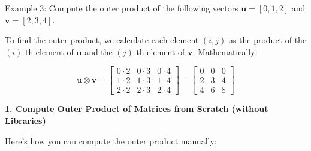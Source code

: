 \documentclass[
  letterpaper,
  DIV=11,
  numbers=noendperiod]{scrreprt}
\theoremstyle{plain}
\theoremstyle{definition}
\theoremstyle{remark}
\begin{document}
Example 3: Compute the outer product of the following vectors
\(\mathbf{u} = [0, 1, 2]\) and \(\mathbf{v} = [2, 3, 4]\).

To find the outer product, we calculate each element \((i, j)\) as the
product of the \((i)\)-th element of \(\mathbf{u}\) and the \((j)\)-th
element of \(\mathbf{v}\). Mathematically:

\[\mathbf{u} \otimes \mathbf{v} = \begin{bmatrix}0 \cdot 2 & 0 \cdot 3 & 0 \cdot 4 \\1 \cdot 2 & 1 \cdot 3 & 1 \cdot 4 \\2 \cdot 2 & 2 \cdot 3 & 2 \cdot 4\end{bmatrix}= \begin{bmatrix}0 & 0 & 0 \\2 & 3 & 4 \\4 & 6 & 8\end{bmatrix}\]

\textbf{1. Compute Outer Product of Matrices from Scratch (without
Libraries)}

Here's how you can compute the outer product manually:
\end{document}
